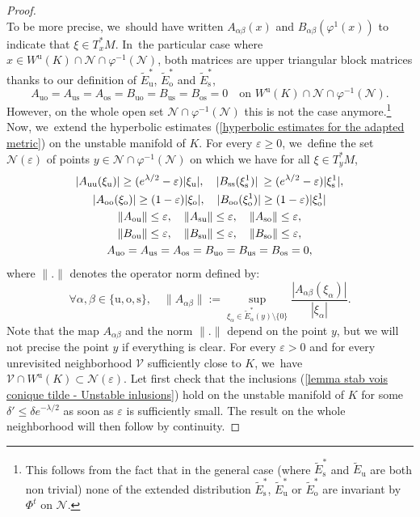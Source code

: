 \documentclass[JEP,XML,SOM,Unicode,NoEqCountersInSection,NoFloatCountersInSection,published]{cedram}
\newcommand{\ro}{\mathrm{o}}
\newcommand{\rs}{\mathrm{s}}
\newcommand{\rso}{\mathrm{so}}
\newcommand{\ru}{\mathrm{u}}
\newcommand{\ruo}{\mathrm{uo}}
\theoremstyle{definition}
\theoremstyle{plain}
\newcommand{\Ncal}{\mathcal{N}}
\newcommand{\Vcal}{\mathcal{V}}
\begin{document}
\begin{proof}
\[\]
To be more precise, we~should have written $A_{\alpha \beta} (x)$ and $B_{\alpha \beta} (\varphi^1(x))$ to indicate that $\xi \in T_x^* M$. In~the particular case where $x \in W^\ru (K) \cap \Ncal \cap \varphi^{-1}(\Ncal)$, both matrices are upper triangular block matrices thanks to our definition of $\widetilde{E}_\ru^*$, $\widetilde{E}_\ro^*$ and $\widetilde{E}_\rs^*$, \ie
\[
A_{\ruo} = A_{\ru\rs} = A_{\ro\rs} = B_{\ruo} = B_{\ru\rs} = B_{\ro\rs} = 0 \quad\text{on }W^\ru (K) \cap \Ncal \cap \varphi^{-1}(\Ncal).
\]
However, on the whole open set $\Ncal \cap \varphi^{-1}(\Ncal)$ this is not the case anymore.\footnote{This follows from the fact that in the general case (where $\widetilde{E}_\rs^*$ and $\widetilde{E}_\ru$ are both non trivial) none of the extended distribution $\widetilde{E}_\rs^*$, $\widetilde{E}_\ru^*$ or $\widetilde{E}_\ro^*$ are invariant by $\Phi^t$ on $\Ncal$.} Now, we~extend the hyperbolic estimates (\ref{hyperbolic estimates for the adapted metric}) on the unstable manifold of $K$. For every $\varepsilon \geq 0$, we~define the set $\Ncal(\varepsilon)$ of points $y \in \Ncal \cap \varphi^{-1}(\Ncal)$ on which we have for all $\xi \in T_{y}^* M$,
\begin{gather}
|A_{\ru\ru} (\xi_\ru)| \geq (e^{\lambda/2 }-\varepsilon) |\xi_\ru|, \quad |B_{\rs\rs} (\xi_\rs^1)| \: \geq (e^{\lambda/2 } - \varepsilon) |\xi_\rs^1|,
\notag\\
\label{eq perturbe: lemme stabilite vois conique tilde - estimées matrices}
|A_{\ro\ro} (\xi_\ro)| \geq (1 - \varepsilon) |\xi_\ro|, \quad |B_{\ro\ro} (\xi_\ro^1)| \geq (1 - \varepsilon) |\xi_\ro^1|
\\
\notag
\| A_{\ro\ru} \| \leq \varepsilon, \quad \| A_{\rs\ru} \| \leq \varepsilon, \quad \| A_{\rso} \| \leq \varepsilon,\\
\notag
\| B_{\ro\ru} \| \leq \varepsilon, \quad \| B_{\rs\ru} \| \leq \varepsilon, \quad \| B_{\rso} \| \leq \varepsilon, \\
\notag
A_{\ruo} = A_{\ru\rs} = A_{\ro\rs} = B_{\ruo} = B_{\ru\rs} = B_{\ro\rs} = 0,
\end{gather}
where $\|. \|$ denotes the operator norm defined by:
\[
\forall \alpha, \beta \in \{\ru,\ro,\rs\}, \quad \| A_{\alpha \beta} \|:= \sup_{\xi_{\alpha} \in \widetilde{E}_{\alpha}^* (y) \setminus \{0 \}} \frac{|A_{\alpha \beta} (\xi_{\alpha})|}{ |\xi_{\alpha}|}.
\]
Note that the map $A_{\alpha \beta}$ and the norm $\|.\|$ depend on the point $y$, but we will not precise the point $y$ if everything is clear. For every $\varepsilon > 0$ and for every unrevisited neighborhood $\Vcal$ sufficiently close to $K$, we~have $\Vcal \cap W^\ru (K) \subset \Ncal (\varepsilon)$. Let first check that the inclusions (\ref{lemma stab vois conique tilde - Unstable inlusions}) hold on the unstable manifold of $K$ for some $\delta' \leq \delta e^{-\lambda/2}$ as soon as $\varepsilon$ is sufficiently small. The result on the whole neighborhood will then follow by continuity.


\end{proof}
\end{document}

